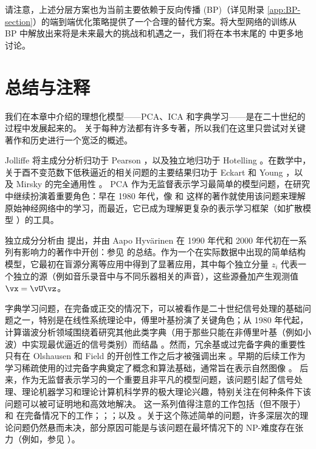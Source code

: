 \documentclass[../../book-main_zh.tex]{subfiles}
\begin{document}
请注意，上述分层方案也为当前主要依赖于反向传播 (BP)（详见附录 \ref{app:BP-section}）的端到端优化策略提供了一个合理的替代方案。将大型网络的训练从 BP 中解放出来将是未来最大的挑战和机遇之一，我们将在本书末尾的  中更多地讨论。


\section{总结与注释}

我们在本章中介绍的理想化模型——PCA、ICA 和字典学习——是在二十世纪的过程中发展起来的。
关于每种方法都有许多专著，所以我们在这里只尝试对关键著作和历史进行一个宽泛的概述。

Jolliffe \cite{Jolliffe1986} 将主成分分析归功于 Pearson \cite{Pearson1901}，以及独立地归功于 Hotelling \cite{Hotelling1933}。在数学中，关于酉不变范数下低秩逼近的相关问题的主要结果归功于 Eckart 和 Young \cite{Eckart1936-ep}，以及 Mirsky 的完全通用性 \cite{Mirsky1960-ek}。
PCA 作为无监督表示学习最简单的模型问题，在研究中继续扮演着重要角色：早在 1980 年代，像 \textcite{Oja1982SimplifiedNM} 和 \textcite{Baldi89} 这样的著作就使用该问题来理解原始神经网络中的学习，而最近，它已成为理解更复杂的表示学习框架（如扩散模型 \cite{wang2024diffusion}）的工具。

独立成分分析由 \textcite{Ans-1985} 提出，并由 Aapo Hyvärinen 在 1990 年代和 2000 年代初在一系列有影响力的著作中开创：参见 \textcite{Hyvrinen-2000} 的总结。作为一个在实际数据中出现的简单结构模型，它最初在盲源分离等应用中得到了显著应用，其中每个独立分量 $z_i$ 代表一个独立的源（例如音乐录音中与不同乐器相关的声音），这些源叠加产生观测值 $\vx = \vU \vz$。

字典学习问题，在完备或正交的情况下，可以被看作是二十世纪信号处理的基础问题之一，特别是在线性系统理论中，傅里叶基扮演了关键角色；从 1980 年代起，计算谐波分析领域围绕着研究其他此类字典（用于那些只能在非傅里叶基（例如小波）中实现最优逼近的信号类别）而结晶 \cite{Donoho1998-zf}。然而，冗余基或过完备字典的重要性只有在 Olshausen 和 Field 的开创性工作之后才被强调出来 \cite{Olshausen1996-ap,Olshausen1997-yv}。早期的后续工作为学习稀疏使用的过完备字典奠定了概念和算法基础，通常旨在表示自然图像 \cite{Donoho2001-tl,DonohoD2003-PNAS,Elad2006-yi,Murray2007-cw,aharon2006k,Mairal2014-nq,Gribonval2015-fy}。
后来，作为无监督表示学习的一个重要且非平凡的模型问题，该问题引起了信号处理、理论机器学习和理论计算机科学界的极大理论兴趣，特别关注在何种条件下该问题可以被可证明地和高效地解决。
这一系列值得注意的工作包括（但不限于）\textcite{Spielman2012-tl} 和 \textcite{sun2017complete_a} 在完备情况下的工作；\textcite{pmlr-v40-Arora15}；\textcite{Barak2015-uu}；以及 \textcite{Qu2020Geometric}。关于这个陈述简单的问题，许多深层次的理论问题仍然悬而未决，部分原因可能是与该问题在最坏情况下的 NP-难度存在张力（例如，参见 \textcite{Tillmann2015-up}）。
\end{document}
